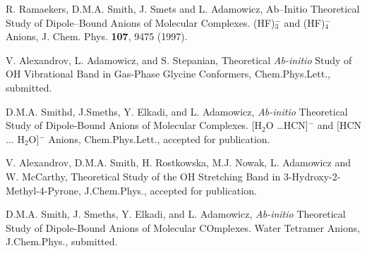 \begin{thebibliography}{999}
R. Ramaekers, D.M.A. Smith, J. Smets 
and L. Adamowicz, Ab--Initio Theoretical
Study of Dipole--Bound Anions of Molecular 
Complexes. (HF)$_3^-$ and (HF)$_4^-$ Anions,
J. Chem. Phys.
{\bf 107}, 9475 (1997).

V. Alexandrov, L. Adamowicz, and S. Stepanian,
Theoretical {\it Ab-initio} Study of OH Vibrational Band
in Gas-Phase Glycine Conformers, Chem.Phys.Lett.,
submitted.

D.M.A. Smithd, J.Smeths, Y. Elkadi, and L. Adamowicz,
{\it Ab-initio} Theoretical Study of Dipole-Bound Anions
of Molecular Complexes. [H$_2$O \dots HCN]$^-$ and
[HCN $\dots$ H$_2$O]$^-$ Anions,
Chem.Phys.Lett., accepted for publication.

V. Alexandrov, D.M.A. Smith, H. Rostkowska, M.J. Nowak, 
L. Adamowicz and W. McCarthy, 
Theoretical Study of the OH Stretching Band in 3-Hydroxy-2-Methyl-4-Pyrone,
J.Chem.Phys., accepted for publication.

D.M.A. Smith, J. Smeths, Y. Elkadi, and L. Adamowicz,
{\it Ab-initio} Theoretical Study of Dipole-Bound Anions
of Molecular COmplexes. Water Tetramer Anions,
J.Chem.Phys., submitted.








\end{thebibliography}
